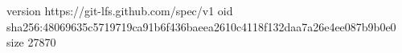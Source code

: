 version https://git-lfs.github.com/spec/v1
oid sha256:48069635c5719719ca91b6f436baeea2610c4118f132daa7a26e4ee087b9b0e0
size 27870
